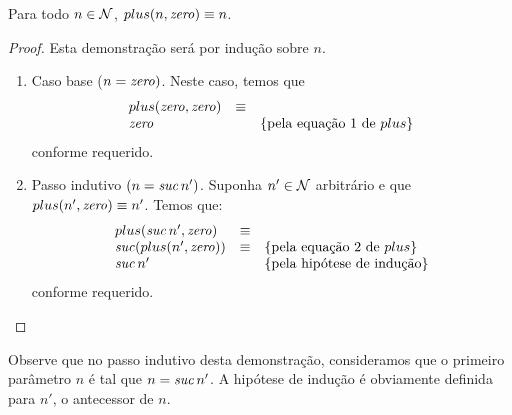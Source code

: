 \begin{Theorem}
Para todo $n\in\mathcal{N}$, $plus(n,\textit{zero\/}) \equiv n$.
\end{Theorem}
\begin{proof}
Esta demonstração será por indução sobre $n$.
\begin{enumerate}
  \item Caso base ($n = \textit{zero\/})$. Neste caso, temos que
  \[
\begin{array}{lcl}
plus(\textit{zero\/},\textit{zero\/}) & \equiv \\
\textit{zero\/}                   & & \{\text{pela equação 1 de }plus\}
\end{array}
  \]
  conforme requerido.
  \item Passo indutivo $(n = \textit{suc\/}\, n')$. Suponha $n'\in\mathcal{N}$ arbitrário e que
    $plus(n',\textit{zero\/}) \equiv n'$. Temos que:
    \[
    \begin{array}{lcl}
plus(\textit{suc\/}\,n',\textit{zero\/}) & \equiv \\
\textit{suc\/}(plus(n',\textit{zero\/}))  & \equiv & \{\text{pela equação 2 de }plus\}\\
\textit{suc\/}\, n'                   & & \{\text{pela hipótese de indução}\}
    \end{array}
    \]
    conforme requerido.
\end{enumerate}
\end{proof}
Observe que no passo indutivo desta demonstração, consideramos que o
primeiro parâmetro $n$ é tal que $n = \textit{suc\/}\,n'$. A hipótese de indução
é obviamente definida para $n'$, o antecessor de $n$.

